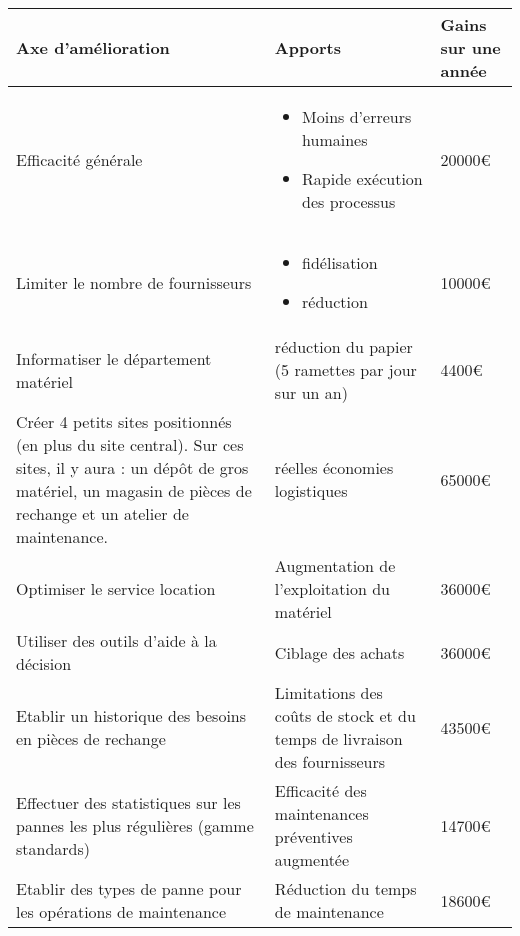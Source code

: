     \begin{tabular}{|p{7cm}|p{5cm}|p{2cm}|}    \hline
\textbf{Axe d'amélioration} & \textbf{Apports} & \textbf{Gains sur une année}\\ \hline

Efficacité générale
                                  & \begin{itemize}
                                      \item Moins d'erreurs humaines
                                      \item Rapide exécution des processus
                                     \end{itemize}
                                                          & 20000€  \\ \hline %
Limiter le nombre de fournisseurs 
                                  & \begin{itemize}
                                      \item fidélisation
                                      \item réduction
                                     \end{itemize}
                                                          & 10000€  \\ \hline %
Informatiser le département matériel 
                                  & réduction du papier (5 ramettes par jour sur un an)
                                                          & 4400€  \\ \hline %
Créer 4 petits sites positionnés (en plus du site central). Sur ces sites, il y aura : un dépôt de gros matériel, un magasin de
pièces de rechange et un atelier de maintenance. 
                                  & réelles économies logistiques
                                                          & 65000€  \\ \hline %
Optimiser le service location 
                                  & Augmentation de l'exploitation du matériel
                                                          &  36000€ \\ \hline %
Utiliser des outils d'aide à la décision
                                  & Ciblage des achats
                                                          &  36000€ \\ \hline %
Etablir un historique des besoins en pièces de rechange
                                  & Limitations des coûts de stock et du temps de livraison des fournisseurs
                                                          &  43500€ \\ \hline %
Effectuer des statistiques sur les pannes les plus régulières (gamme standards)
                                  & Efficacité des maintenances préventives augmentée
                                                          &   14700€\\ \hline %
Etablir des types de panne pour les opérations de maintenance
                                  & Réduction du temps de maintenance
                                                          &   18600€\\ \hline %


\end{tabular}
